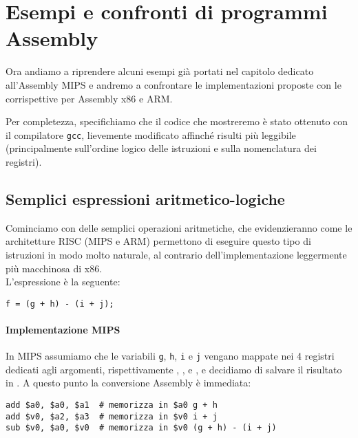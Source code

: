 \documentclass[class=book, crop=false, oneside]{standalone}
\begin{document}
\chapter{Esempi e confronti di programmi Assembly}\label{ch:asm}
Ora andiamo a riprendere alcuni esempi già portati nel capitolo dedicato all'Assembly MIPS e andremo a confrontare le implementazioni proposte con le corrispettive per Assembly x86 e ARM.

Per completezza, specifichiamo che il codice che mostreremo è stato ottenuto con il compilatore \texttt{gcc}, lievemente modificato affinché risulti più leggibile (principalmente sull'ordine logico delle istruzioni e sulla nomenclatura dei registri).

\section{Semplici espressioni aritmetico-logiche}
Cominciamo con delle semplici operazioni aritmetiche, che evidenzieranno come le architetture RISC (MIPS e ARM) permettono di eseguire questo tipo di istruzioni in modo molto naturale, al contrario dell'implementazione leggermente più macchinosa di x86.\\
L'espressione è la seguente:
\begin{verbatim}
f = (g + h) - (i + j);
\end{verbatim}

\subsubsection{Implementazione MIPS}
In MIPS assumiamo che le variabili \texttt{g}, \texttt{h}, \texttt{i} e \texttt{j} vengano mappate nei 4 registri dedicati agli argomenti, rispettivamente , ,  e , e decidiamo di salvare il risultato in . A questo punto la conversione Assembly è immediata:
\begin{verbatim}
add $a0, $a0, $a1  # memorizza in $a0 g + h
add $v0, $a2, $a3  # memorizza in $v0 i + j
sub $v0, $a0, $v0  # memorizza in $v0 (g + h) - (i + j)
\end{verbatim}
\end{document}
